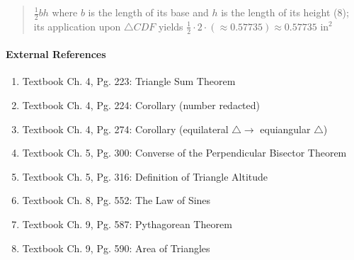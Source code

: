 \documentclass[letterpaper,12pt,twoside]{report}
\begin{document}
\begin{quotation}
$\frac{1}{2}bh$ where $b$ is the length of its base and $h$ is the length of its height (8); its application upon $\triangle CDF$ yields $\frac{1}{2}\cdot 2\cdot (\approx 0.57735)\approx \boxed{0.57735 \text{  in}^2}$
		
		\end{quotation}
	
	\paragraph{External References}
	
	\begin{enumerate}
		\item Textbook Ch. 4, Pg. 223: Triangle Sum Theorem
		\item Textbook Ch. 4, Pg. 224: Corollary (number redacted)
		\item Textbook Ch. 4, Pg. 274: Corollary (equilateral $\triangle \rightarrow$ equiangular $\triangle$)
		\item Textbook Ch. 5, Pg. 300: Converse of the Perpendicular Bisector Theorem
		\item Textbook Ch. 5, Pg. 316: Definition of Triangle Altitude
		\item Textbook Ch. 8, Pg. 552: The Law of Sines
		\item Textbook Ch. 9, Pg. 587: Pythagorean Theorem
		\item Textbook Ch. 9, Pg. 590: Area of Triangles
	\end{enumerate}
	
\end{document}
